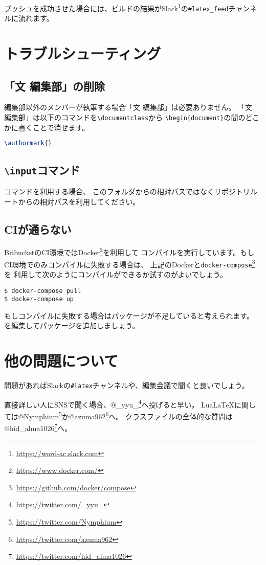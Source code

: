 \documentclass[../../main]{subfiles}
\begin{document}
プッシュを成功させた場合には、ビルドの結果がSlack\footnote{\url{https://word-ac.slack.com}}の\texttt{\#latex\_feed}チャンネルに流れます。

\section{トラブルシューティング}

\subsection{「文 編集部」の削除}

編集部以外のメンバーが執筆する場合「文 編集部」は必要ありません。
「文　編集部」は以下のコマンドを\lstinline|\documentclass|から
\lstinline|\begin{document}|の間のどこかに書くことで消せます。

\begin{lstlisting}[language=TeX, mathescape]
\authormark{}    
\end{lstlisting}

\subsection{\texttt{\textbackslash input}コマンド}

\lstinline||コマンドを利用する場合、
このフォルダからの相対パスではなくリポジトリルートからの相対パスを利用してください。

\subsection{CIが通らない}

BitbucketのCI環境ではDocker\footnote{\url{https://www.docker.com/}}を利用して
コンパイルを実行しています。もしCI環境でのみコンパイルに失敗する場合は、
上記のDockerと\lstinline|docker-compose|\footnote{\url{https://github.com/docker/compose}}を
利用して次のようにコンパイルができるか試すのがよいでしょう。

\begin{lstlisting}
$ docker-compose pull
$ docker-compose up
\end{lstlisting}

もしコンパイルに失敗する場合はパッケージが不足していると考えられます。
を編集してパッケージを追加しましょう。

\section{他の問題について}

問題があればSlackの\texttt{\#latex}チャンネルや、編集会議で聞くと良いでしょう。

直接詳しい人にSNSで聞く場合、@\_yyu\_\footnote{\url{https://twitter.com/_yyu_}}へ投げると早い。
Lua\LaTeX に関しては@Nymphium\footnote{\url{https://twitter.com/Nymphium}}か@azuma962\footnote{\url{https://twitter.com/azuma962}}へ。
クラスファイルの全体的な質問は@hid\_alma1026\footnote{\url{https://twitter.com/hid_alma1026}}へ。
\end{document}
